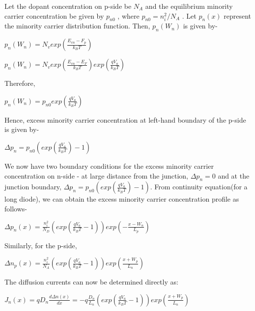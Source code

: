 \documentclass[12 pt]{article}
\begin{document}
Let the dopant concentration on p-side be $N_{A}$ and the equilibrium minority carrier concentration be given by $p_{n0}$ , where $p_{n0} = n_{i}^{2}/N_{A}$ . Let $p_{n}(x)$ represent the minority carrier distribution function. Then, $p_{n}(W_{n})$ is given by- \par

\begin{center}
    $ p_{n}(W_{n}) = N_{v}exp(\frac{E_{vn}-F_{p}}{k_{B}T})  $
\end{center}

\begin{center}
    $ p_{n}(W_{n}) = N_{v}exp(\frac{E_{vn}-E_{F}}{k_{B}T})exp(\frac{qV_{a}}{k_{B}T})  $
\end{center}

Therefore, 

\begin{center}
    $  p_{n}(W_{n}) = p_{n0}exp(\frac{qV_{a}}{k_{B}T})  $
\end{center}

Hence, excess minority carrier concentration at left-hand boundary of the p-side is given by- 

\begin{center}
    $ \Delta p_{n} = p_{n0}(exp(\frac{qV_{a}}{k_{B}T})-1)  $
\end{center}

We now have two boundary conditions for the excess minority carrier concentration on n-side - at large distance from the junction, $\Delta p_{n} = 0 $ and at the junction boundary, $\Delta p_{n} = p_{n0}(exp(\frac{qV_{a}}{k_{B}T})-1) $. From continuity equation(for a long diode), we can obtain the excess minority carrier concentration profile as follows- 

\begin{center}
  $ \Delta p_{n}(x) = \frac{n_{i}^{2}}{N_{D}}(exp(\frac{qV_{a}}{k_{B}T}-1))exp(-\frac{x-W_{n}}{L_{p}})  $
\end{center}

Similarly, for the p-side, 

\begin{center}
   $ \Delta n_{p}(x) = \frac{n_{i}^{2}}{N_{A}}(exp(\frac{qV_{a}}{k_{B}T}-1))exp(\frac{x+W_{p}}{L_{n}})  $
\end{center}

The diffusion currents can now be determined directly as:

\begin{center}
    $  J_{n}(x) = qD_{n}\frac{d\Delta n(x)}{dx} = -q\frac{D_{n}}{L_{n}}(exp(\frac{qV_{a}}{k_{B}T}-1))exp(\frac{x+W_{p}}{L_{n}})$
\end{center}
\end{document}

